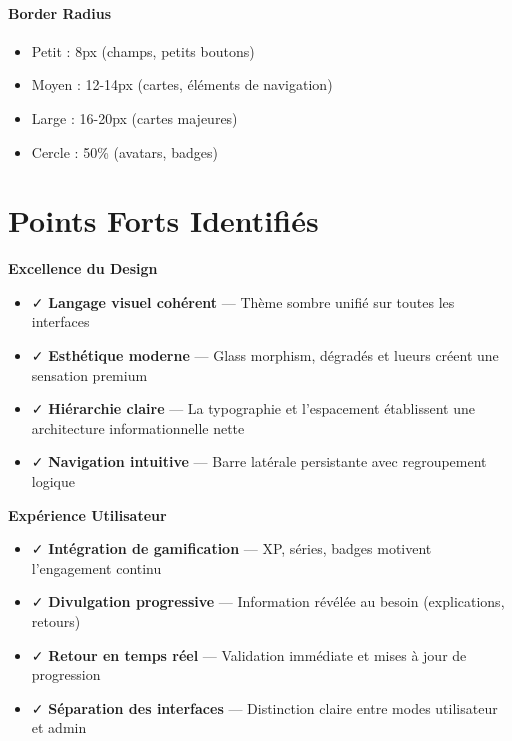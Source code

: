 \documentclass[12pt, a4paper]{report}
\begin{document}
\paragraph{Border Radius}
\begin{itemize}
    \item Petit : 8px (champs, petits boutons)
    \item Moyen : 12-14px (cartes, éléments de navigation)
    \item Large : 16-20px (cartes majeures)
    \item Cercle : 50\% (avatars, badges)
\end{itemize}

\section{Points Forts Identifiés}

\begin{keypoint}
\textbf{Excellence du Design}
\begin{itemize}
    \item ✓ \textbf{Langage visuel cohérent} --- Thème sombre unifié sur toutes les interfaces
    \item ✓ \textbf{Esthétique moderne} --- Glass morphism, dégradés et lueurs créent une sensation premium
    \item ✓ \textbf{Hiérarchie claire} --- La typographie et l'espacement établissent une architecture informationnelle nette
    \item ✓ \textbf{Navigation intuitive} --- Barre latérale persistante avec regroupement logique
\end{itemize}
\end{keypoint}

\begin{keypoint}
\textbf{Expérience Utilisateur}
\begin{itemize}
    \item ✓ \textbf{Intégration de gamification} --- XP, séries, badges motivent l'engagement continu
    \item ✓ \textbf{Divulgation progressive} --- Information révélée au besoin (explications, retours)
    \item ✓ \textbf{Retour en temps réel} --- Validation immédiate et mises à jour de progression
    \item ✓ \textbf{Séparation des interfaces} --- Distinction claire entre modes utilisateur et admin
\end{itemize}
\end{keypoint}
\end{document}

